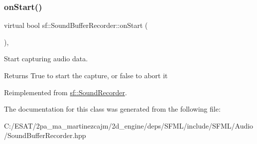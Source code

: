\subsubsection{\texorpdfstring{on\+Start()}{onStart()}}
{\footnotesize\ttfamily virtual bool sf\+::\+Sound\+Buffer\+Recorder\+::on\+Start (\begin{DoxyParamCaption}{ }\end{DoxyParamCaption})\hspace{0.3cm}{\ttfamily [protected]}, {\ttfamily [virtual]}}



Start capturing audio data. 

\begin{DoxyReturn}{Returns}
True to start the capture, or false to abort it 
\end{DoxyReturn}


Reimplemented from \hyperlink{classsf_1_1_sound_recorder_a7af418fb036201d3f85745bef78ce77f}{sf\+::\+Sound\+Recorder}.



The documentation for this class was generated from the following file\+:\begin{DoxyCompactItemize}
\item 
C\+:/\+E\+S\+A\+T/2pa\+\_\+ma\+\_\+martinezcajm/2d\+\_\+engine/deps/\+S\+F\+M\+L/include/\+S\+F\+M\+L/\+Audio/Sound\+Buffer\+Recorder.\+hpp\end{DoxyCompactItemize}
